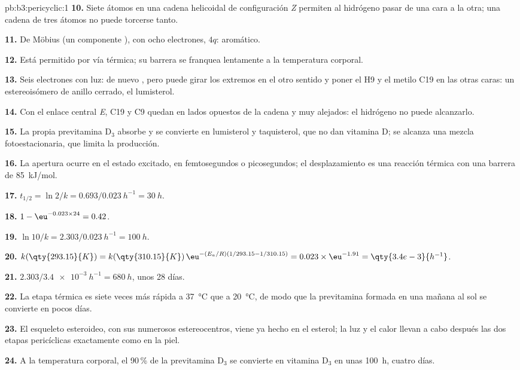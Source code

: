 \begin{solution}{pb:b3:pericyclic:1}
\textbf{10.} Siete átomos en una cadena helicoidal de configuración \textit{Z} permiten al hidrógeno pasar de una cara a
la otra; una cadena de tres átomos no puede torcerse tanto.

\textbf{11.} De Möbius (un componente ), con ocho electrones, $4q$: aromático.

\textbf{12.} Está permitido por vía térmica; su barrera se franquea lentamente a la temperatura corporal.

\textbf{13.} Seis electrones con luz: de nuevo , pero puede girar los extremos en el
otro sentido y poner el H9 y el metilo C19 en las otras caras: un estereoisómero
de anillo cerrado, el lumisterol.

\textbf{14.} Con el enlace central \textit{E}, C19 y C9 quedan en lados opuestos de la cadena y muy
alejados: el hidrógeno no puede alcanzarlo.

\textbf{15.} La propia previtamina D$_3$ absorbe y se convierte en lumisterol y taquisterol,
que no dan vitamina D; se alcanza una mezcla fotoestacionaria, que limita la
producción.

\textbf{16.} La apertura ocurre en el estado excitado, en femtosegundos o picosegundos;
el desplazamiento es una reacción térmica con una barrera de \qty{85}{kJ/mol}.

\textbf{17.} $t_{1/2} = \ln 2/k = 0.693/\qty{0.023}{h^{-1}} = \qty{30}{h}$.

\textbf{18.} $1 - \eu^{-0.023 \times 24} = 0.42$.

\textbf{19.} $\ln 10/k = 2.303/\qty{0.023}{h^{-1}} = \qty{100}{h}$.

\textbf{20.} $k(\qty{293.15}{K}) = k(\qty{310.15}{K})\,\eu^{-(E_a/R)(1/293.15 - 1/310.15)} = 0.023 \times \eu^{-1.91} = \qty{3.4e-3}{h^{-1}}$.

\textbf{21.} $2.303/\qty{3.4e-3}{h^{-1}} = \qty{680}{h}$, unos 28 días.

\textbf{22.} La etapa térmica es siete veces más rápida a \qty{37}{\celsius} que a \qty{20}{\celsius}, de modo que la
previtamina formada en una mañana al sol se convierte en pocos días.

\textbf{23.} El esqueleto esteroideo, con sus numerosos estereocentros, viene ya hecho en
el esterol; la luz y el calor llevan a cabo después las dos etapas pericíclicas exactamente como en
la piel.

\textbf{24.} A la temperatura corporal, el 90\,\% de la previtamina D$_3$ se convierte en vitamina D$_3$ en unas
\qty{100}{h}, cuatro días.
\end{solution}
